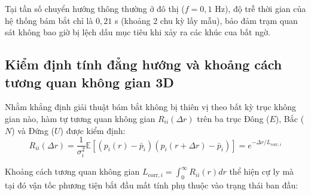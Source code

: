 \begin{table}[H]
\centering
\caption{Khảo sát độ trễ nhóm $\tau_g$ và góc trễ pha $\Phi$ theo tần số cơ động mục tiêu}
\label{tab:group-delay-frequency-table}
\end{table}

Tại tần số chuyển hướng thông thường ở đô thị ($f = 0{,}1$ Hz), độ trễ thời gian của hệ thống bám bắt chỉ là $0{,}21$ s (khoảng 2 chu kỳ lấy mẫu), bảo đảm trạm quan sát không bao giờ bị lệch dấu mục tiêu khi xảy ra các khúc cua bất ngờ.

\subsection{Kiểm định tính đẳng hướng và khoảng cách tương quan không gian 3D}

\hspace{0.5cm} Nhằm khẳng định giải thuật bám bắt không bị thiên vị theo bất kỳ trục không gian nào, hàm tự tương quan không gian $R_{ii}(\Delta r)$ trên ba trục Đông ($E$), Bắc ($N$) và Đứng ($U$) được kiểm định:
\begin{equation}
R_{ii}(\Delta r) = \frac{1}{\sigma_i^2} \mathbb{E}[(p_i(r) - \bar{p}_i)(p_i(r + \Delta r) - \bar{p}_i)] = e^{-\Delta r / L_{\text{corr}, i}}
\label{eq:spatial-autocorrelation-decay}
\end{equation}

Khoảng cách tương quan không gian $L_{\text{corr}, i} = \int_0^\infty R_{ii}(r) dr$ thể hiện cự ly mà tại đó vận tốc phương tiện bắt đầu mất tính phụ thuộc vào trạng thái ban đầu:

